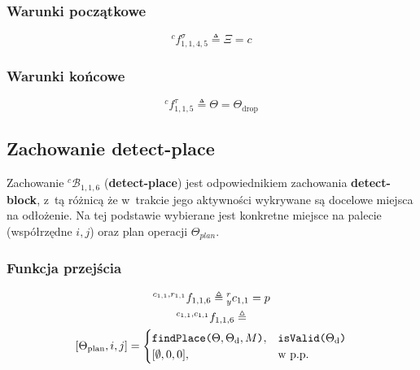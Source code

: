 \subsubsection{Warunki początkowe}
\begin{equation}
    {}^{c}f^{\sigma}_{1,1,4,5} \triangleq \Xi = c
\end{equation}

\subsubsection{Warunki końcowe}
\begin{equation}
    {}^{c}f^{\tau}_{1,1,5} \triangleq \Theta = \Theta_{\mathrm{drop}}
\end{equation}


\subsection{Zachowanie detect-place}
\label{subsec:cs-detect-place}
Zachowanie ${}^{c}\mathcal{B}_{1,1,6}$ (\textbf{detect-place}) jest odpowiednikiem zachowania \textbf{detect-block}, z~tą różnicą że w~trakcie jego aktywności wykrywane są docelowe miejsca na odłożenie. Na tej podstawie wybierane jest konkretne miejsce na palecie (współrzędne $i,j$) oraz plan operacji $\Theta_{plan}$.

\subsubsection{Funkcja przejścia}
\begin{equation}
    \begin{gathered}
        {}^{c_{1,1}, r_{1,1}}f_{1,1,6} \triangleq {}^{r}_{y}c_{1,1} = p\\
        {}^{c_{1,1}, c_{1,1}}f_{1,1,6} \triangleq \\ [\Theta_{\mathrm{plan}}, i, j] =
            \begin{cases}
			    \text{\texttt{findPlace($\Theta, \Theta_{\mathrm{d}}, M$)}}, & \text{\texttt{isValid($\Theta_{\mathrm{d}}$)}}\\
                [\emptyset, 0, 0], & \text{w p.p.}
		    \end{cases}
    \end{gathered}
\end{equation}

